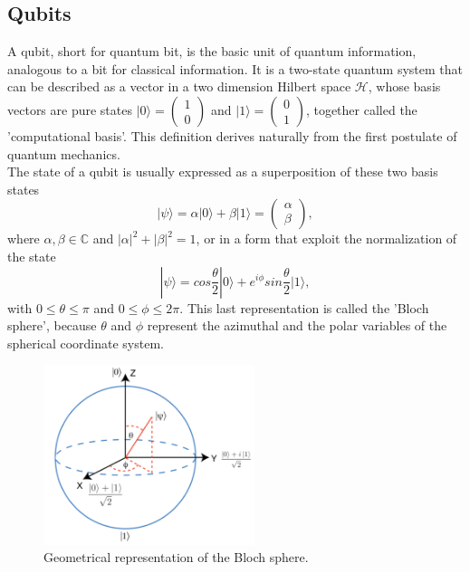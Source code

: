 \subsection{Qubits}
A qubit, short for quantum bit, is the basic unit of quantum information, analogous to a bit for classical information. It is a two-state quantum system that can be described as a vector in a two dimension Hilbert space $\mathcal{H}$, whose basis vectors are pure states $|0\rangle = \left( \begin{array}{c} 1 \\ 0 \end{array} \right)$ and $|1\rangle = \left( \begin{array}{c} 0 \\ 1 \end{array} \right)$, together called the 'computational basis'. This definition derives naturally from the first postulate of quantum mechanics. \\
The state of a qubit is usually expressed as a superposition of these two basis states
\begin{equation}
    |\psi\rangle = \alpha |0\rangle + \beta |1\rangle = \left( \begin{array}{c} \alpha \\ \beta \end{array} \right), \label{qubit}
\end{equation}
where $\alpha, \beta \in \mathbb{C}$ and $|\alpha|^2 + |\beta|^2 = 1$, or in a form that exploit the normalization of the state
\begin{equation}
    |\psi\rangle = cos \frac{\theta}{2} |0\rangle + e^{i\phi} sin \frac{\theta}{2} |1\rangle,
\end{equation}
with $0 \leq \theta \leq \pi$ and $0 \leq \phi \leq 2\pi$. This last representation is called the 'Bloch sphere', because $\theta$ and $\phi$ represent the azimuthal and the polar variables of the spherical coordinate system.
\begin{figure}[ht]
  \centering
  \includegraphics[width=0.55\textwidth]{figures/Bloch sphere.png}
  \caption{Geometrical representation of the Bloch sphere.}
\end{figure} \\
